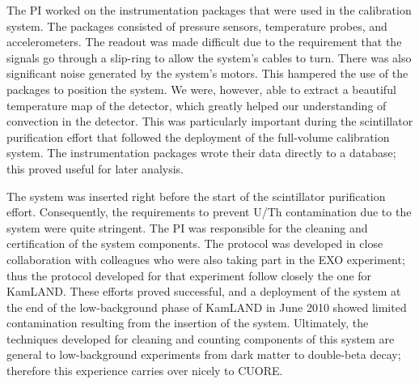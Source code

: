 The PI worked on the instrumentation packages that were used in the calibration system. The packages consisted of pressure sensors, temperature probes, and accelerometers. The readout was made difficult due to the requirement that the signals go through a slip-ring to allow the system's cables to turn. There was also significant noise generated by the system's motors. This hampered the use of the packages to position the system. We were, however, able to extract a beautiful temperature map of the detector, which greatly helped our understanding of convection in the detector. This was particularly important during the scintillator purification effort that followed the deployment of the full-volume calibration system. The instrumentation packages wrote their data directly to a database; this proved useful for later analysis.

The system was inserted right before the start of the scintillator purification effort. Consequently, the requirements to prevent U/Th contamination due to the system were quite stringent. The PI was responsible for the cleaning and certification of the system components. The protocol was developed in close collaboration with colleagues who were also taking part in the EXO experiment; thus the protocol developed for that experiment \cite{Leonard:2007uv} follow closely the one for KamLAND\cite{fourpi}. These efforts proved successful, and a deployment of the system at the end of the low-background phase of KamLAND in June 2010 showed limited contamination resulting from the insertion of the system.  Ultimately, the techniques developed for cleaning and counting components of this system are general to low-background experiments from dark matter to double-beta decay; therefore this experience carries over nicely to CUORE.

